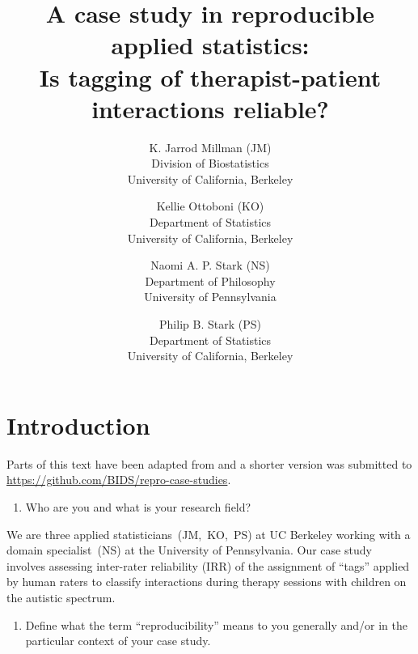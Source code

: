 \documentclass[]{article}
\date{}
\begin{document}
\title{A case study in reproducible applied statistics:\\
Is tagging of therapist-patient interactions reliable?
}

\author{K. Jarrod Millman (JM)\\ Division of Biostatistics\\ University of California, Berkeley \and
Kellie Ottoboni (KO)\\ Department of Statistics\\ University of California, Berkeley \and
Naomi A. P. Stark (NS)\\ Department of Philosophy\\ University of Pennsylvania \and
Philip B. Stark (PS)\\ Department of Statistics\\ University of California, Berkeley
}

\maketitle


\section{Introduction}

Parts of this text have been adapted from \citet{millman2015thesis} and a
shorter version was submitted to
\url{https://github.com/BIDS/repro-case-studies}.


\begin{enumerate}
\def\labelenumi{\arabic{enumi})}
\itemsep1pt\parskip0pt
\item
  Who are you and what is your research field?
\end{enumerate}

We are three applied statisticians~(JM,~KO,~PS) at UC Berkeley working with a
domain specialist~(NS) at the University of Pennsylvania.
Our case study involves assessing inter-rater reliability (IRR) of the assignment
of ``tags'' applied by human raters
to classify interactions during therapy sessions with children on the autistic spectrum.

\begin{enumerate}
\def\labelenumi{\arabic{enumi})}
\setcounter{enumi}{1}
\itemsep1pt\parskip0pt
\item
  Define what the term ``reproducibility'' means to you generally and/or
  in the particular context of your case study.
\end{enumerate}
\end{document}

